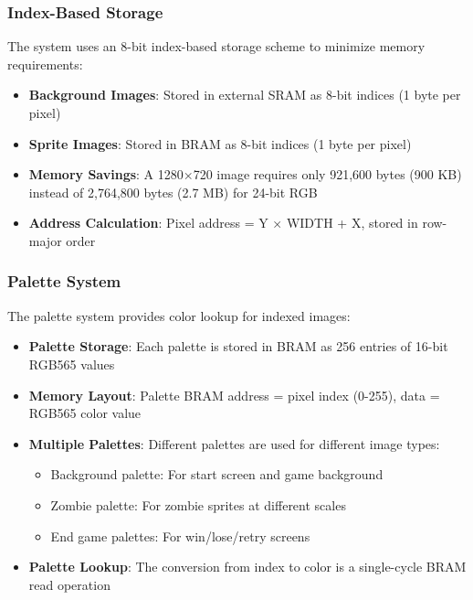 \documentclass[12pt,a4paper]{article}
\begin{document}
\subsubsection{Index-Based Storage}
The system uses an 8-bit index-based storage scheme to minimize memory requirements:
\begin{itemize}
    \item \textbf{Background Images}: Stored in external SRAM as 8-bit indices (1 byte per pixel)
    \item \textbf{Sprite Images}: Stored in BRAM as 8-bit indices (1 byte per pixel)
    \item \textbf{Memory Savings}: A 1280×720 image requires only 921,600 bytes (900 KB) instead of 2,764,800 bytes (2.7 MB) for 24-bit RGB
    \item \textbf{Address Calculation}: Pixel address = Y × WIDTH + X, stored in row-major order
\end{itemize}

\subsubsection{Palette System}
The palette system provides color lookup for indexed images:
\begin{itemize}
    \item \textbf{Palette Storage}: Each palette is stored in BRAM as 256 entries of 16-bit RGB565 values
    \item \textbf{Memory Layout}: Palette BRAM address = pixel index (0-255), data = RGB565 color value
    \item \textbf{Multiple Palettes}: Different palettes are used for different image types:
    \begin{itemize}
        \item Background palette: For start screen and game background
        \item Zombie palette: For zombie sprites at different scales
        \item End game palettes: For win/lose/retry screens
    \end{itemize}
    \item \textbf{Palette Lookup}: The conversion from index to color is a single-cycle BRAM read operation
\end{itemize}
\end{document}
